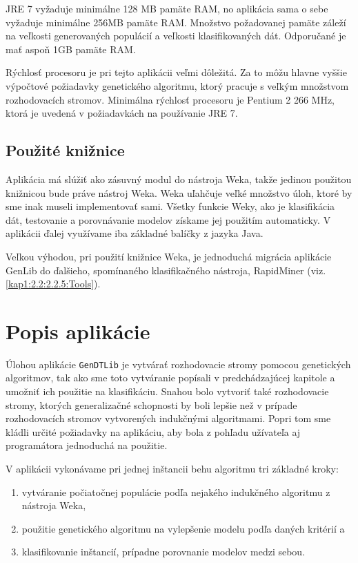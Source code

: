 JRE 7 vyžaduje minimálne 128 MB pamäte RAM, no aplikácia sama o sebe vyžaduje minimálne 256MB pamäte RAM. Množstvo požadovanej pamäte záleží na veľkosti generovaných populácií a veľkosti klasifikovaných dát. Odporučané je mať aspoň 1GB pamäte RAM.

Rýchlosť procesoru je pri tejto aplikácii veľmi dôležitá. Za to môžu hlavne vyššie výpočtové požiadavky genetického algoritmu, ktorý pracuje s veľkým množstvom rozhodovacích stromov. Minimálna rýchlosť procesoru je Pentium 2 266 MHz, ktorá je uvedená v požiadavkách na používanie JRE 7.
\subsection{Použité knižnice}\label{kap4:4.1:4.1.4:Libs}
Aplikácia má slúžiť ako zásuvný modul do nástroja Weka, takže jedinou použitou knižnicou bude práve nástroj Weka. Weka uľahčuje veľké množstvo úloh, ktoré by sme inak museli implementovať sami. Všetky funkcie Weky, ako je klasifikácia dát, testovanie a porovnávanie modelov získame jej použitím automaticky. V aplikácii ďalej využívame iba základné balíčky z jazyka Java. 

Veľkou výhodou, pri použití knižnice Weka, je jednoduchá migrácia aplikácie GenLib do ďalšieho, spomínaného klasifikačného nástroja, RapidMiner (viz. \ref{kap1:2.2:2.2.5:Tools}).

\section{Popis aplikácie}\label{kap4:4.2:About}
Úlohou aplikácie \verb|GenDTLib| je vytvárať rozhodovacie stromy pomocou genetických algoritmov, tak ako sme toto vytváranie popísali v predchádzajúcej kapitole a umožniť ich použitie na klasifikáciu. Snahou bolo vytvoriť také rozhodovacie stromy, ktorých generalizačné schopnosti by boli lepšie než v prípade rozhodovacích stromov vytvorených indukčnými algoritmami. Popri tom sme kládli určité požiadavky na aplikáciu, aby bola z pohľadu užívateľa aj programátora jednoduchá na použitie.

V aplikácii vykonávame pri jednej inštancii behu algoritmu tri základné kroky:
\begin{enumerate}
\item vytváranie počiatočnej populácie podľa nejakého indukčného algoritmu z nástroja Weka,
\item použitie genetického algoritmu na vylepšenie modelu podľa daných kritérií a
\item klasifikovanie inštancií, prípadne porovnanie modelov medzi sebou.
\end{enumerate}

